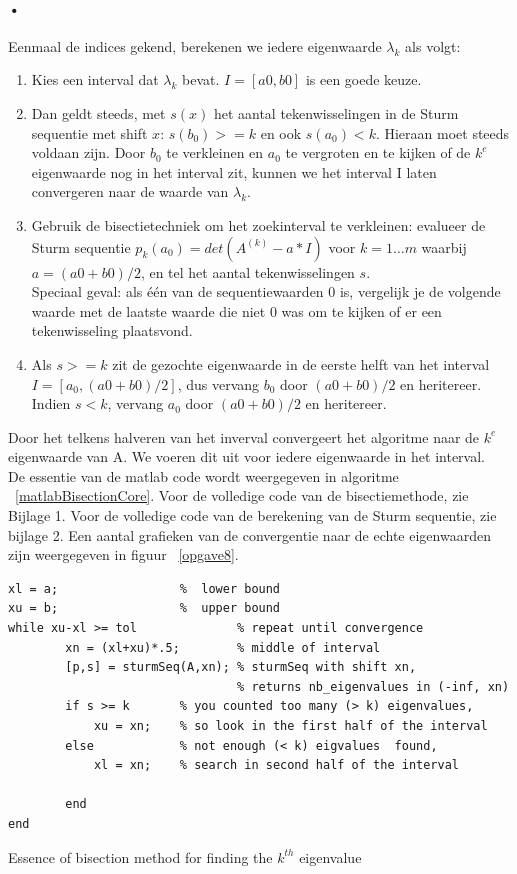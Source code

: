\documentclass[]{article}
\begin{document}
\paragraph{•}
Eenmaal de indices gekend, berekenen we iedere eigenwaarde $\lambda_k$ als volgt:
	\begin{enumerate}
 	\item Kies een interval dat $\lambda_k$ bevat. $I=[a0,b0]$  is een goede keuze.
 	\item Dan geldt steeds, met  $s(x)$ het aantal tekenwisselingen in de Sturm sequentie met shift $x$: \(s(b_0) >= k \) en ook \( s(a_0) < k \). Hieraan moet steeds voldaan zijn. Door $b_0$ te verkleinen en $a_0$ te vergroten en te kijken of de $k^e$ eigenwaarde nog in het interval zit, kunnen we het interval I laten convergeren naar de waarde van $\lambda_k$.
 	\item Gebruik de bisectietechniek om het zoekinterval te verkleinen: evalueer de Sturm sequentie $p_k(a_0) = det(A^{(k)} - a*I)$ voor $k=1\dots m$ waarbij $a=(a0+b0)/2$, en tel het aantal tekenwisselingen $s$.\\ 
 	Speciaal geval: als \'{e}\'{e}n van de sequentiewaarden 0 is, vergelijk je de volgende waarde met de laatste waarde die niet 0 was om te kijken of er een tekenwisseling plaatsvond. 
 	\item Als $s >= k$ zit de gezochte eigenwaarde in de eerste helft van het interval $I=[a_0,(a0+b0)/2]$, dus vervang $b_0$ door $(a0+b0)/2$ en heritereer.\\
 Indien $s < k$, vervang $a_0$ door $(a0+b0)/2$ en heritereer.
 \end{enumerate}
Door het telkens halveren van het inverval convergeert het algoritme naar de $k^e$ eigenwaarde van A. We voeren dit uit voor iedere eigenwaarde in het interval.\\
De essentie van de matlab code wordt weergegeven in algoritme ~\ref{matlabBisectionCore}. Voor de volledige code van de bisectiemethode, zie Bijlage 1. Voor de volledige code van de berekening van de Sturm sequentie, zie bijlage 2.
Een aantal grafieken van de convergentie naar de echte eigenwaarden zijn weergegeven in figuur ~\ref{opgave8}.


\begin{framed}
\begin{algorithm}[H]
\begin{lstlisting}
xl = a; 				%  lower bound
xu = b; 				%  upper bound
while xu-xl >= tol				% repeat until convergence
        xn = (xl+xu)*.5; 		% middle of interval
        [p,s] = sturmSeq(A,xn); % sturmSeq with shift xn, 
        						% returns nb_eigenvalues in (-inf, xn)
        if s >= k       % you counted too many (> k) eigenvalues, 
        	xu = xn;	% so look in the first half of the interval
        else            % not enough (< k) eigvalues  found, 
        	xl = xn;	% search in second half of the interval
            
        end
end

\end{lstlisting}
\caption{Essence of bisection method for finding the $k^{th}$ eigenvalue}
\label{matlabBisectionCore}
\end{algorithm}
\end{framed}
\end{document}
